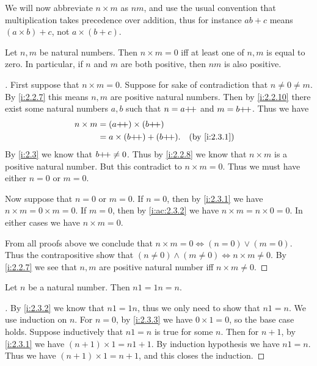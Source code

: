 \begin{note}
  We will now abbreviate \(n \times m\) as \(nm\), and use the usual convention that multiplication takes precedence over addition, thus for instance \(ab + c\) means \((a \times b) + c\), not \(a \times (b + c)\).
\end{note}

\begin{lem}\label{i:2.3.3}
  Let \(n, m\) be natural numbers.
  Then \(n \times m = 0\) iff at least one of \(n, m\) is equal to zero.
  In particular, if \(n\) and \(m\) are both positive, then \(nm\) is also positive.
\end{lem}

\begin{proof}[]
  First suppose that \(n \times m = 0\).
  Suppose for sake of contradiction that \(n \neq 0 \neq m\).
  By \cref{i:2.2.7} this means \(n, m\) are positive natural numbers.
  Then by \cref{i:2.2.10} there exist some natural numbers \(a, b\) such that \(n = a{+}\!{+}\) and \(m = b{+}\!{+}\).
  Thus we have
  \begin{align*}
    n \times m & = (a\pp) \times (b\pp)                        \\
               & = a \times (b\pp) + (b\pp). &  & \by{i:2.3.1}
  \end{align*}
  By \cref{i:2.3} we know that \(b{+}\!{+} \neq 0\).
  Thus by \cref{i:2.2.8} we know that \(n \times m\) is a positive natural number.
  But this contradict to \(n \times m = 0\).
  Thus we must have either \(n = 0\) or \(m = 0\).

  Now suppose that \(n = 0\) or \(m = 0\).
  If \(n = 0\), then by \cref{i:2.3.1} we have \(n \times m = 0 \times m = 0\).
  If \(m = 0\), then by \cref{i:ac:2.3.2} we have \(n \times m = n \times 0 = 0\).
  In either cases we have \(n \times m = 0\).

  From all proofs above we conclude that \(n \times m = 0 \iff (n = 0) \lor (m = 0)\).
  Thus the contrapositive show that \((n \neq 0) \land (m \neq 0) \iff n \times m \neq 0\).
  By \cref{i:2.2.7} we see that \(n, m\) are positive natural number iff \(n \times m \neq 0\).
\end{proof}

\begin{ac}\label{i:ac:2.3.4}
  Let \(n\) be a natural number.
  Then \(n1 = 1n = n\).
\end{ac}

\begin{proof}[]
  By \cref{i:2.3.2} we know that \(n1 = 1n\), thus we only need to show that \(n1 = n\).
  We use induction on \(n\).
  For \(n=0\), by \cref{i:2.3.3} we have \(0 \times 1 = 0\), so the base case holds.
  Suppose inductively that \(n1 = n\) is true for some \(n\).
  Then for \(n + 1\), by \cref{i:2.3.1} we have \((n + 1) \times 1 = n1 + 1\).
  By induction hypothesis we have \(n1 = n\).
  Thus we have \((n + 1) \times 1 = n + 1\), and this closes the induction.
\end{proof}

